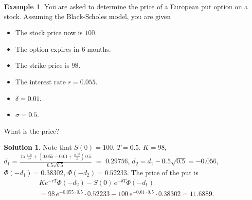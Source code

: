\documentclass[10pt,handout]{beamer}
\newcommand{\ds}{\displaystyle}
\theoremstyle{definition}
\newtheorem*{ex}{Example}
\newtheorem*{sol}{Solution}
\begin{document}
\begin{frame}{}
  \begin{ex} You are asked to determine the price of a European put option on a stock. Assuming the Black-Scholes model, you are given
    \begin{multicols}{2}
      \begin{itemize}
        \item The stock price now is $100$.
        \item The option expires in $6$ months.
        \item The strike price is $98$.
        \item The interest rate $r = 0.055$.
        \item $\delta = 0.01$.
        \item $\sigma = 0.5$.
      \end{itemize}
    \end{multicols}
    What is the price?
  \end{ex}
  \begin{sol}
    Note that $S(0) = 100$, $T = 0.5$, $K = 98$, $\ds d_1 = \frac{\ln\frac{100}{98} + (0.055 - 0.01 + \frac{0.5^2}{2})\,0.5}{0.5\sqrt{0.5}}$ $=$ $0.29756$, $d_2 = d_1 - 0.5\sqrt{0.5} = -0.056$, $\Phi(-d_1) = 0.38302$, $\Phi(-d_2) = 0.52233$. The price of the put is \vspace{-3mm}
    \begin{multline*}
      Ke^{-rT}\Phi(-d_2) - S(0)\,e^{-\delta T}\Phi(-d_1) \\= 98\,e^{-0.055\cdot 0.5}\cdot 0.52233 - 100\,e^{-0.01\cdot 0.5}\cdot 0.38302 = 11.6889.
    \end{multline*}
  \end{sol}
\end{frame}

%  
%  
\end{document}
